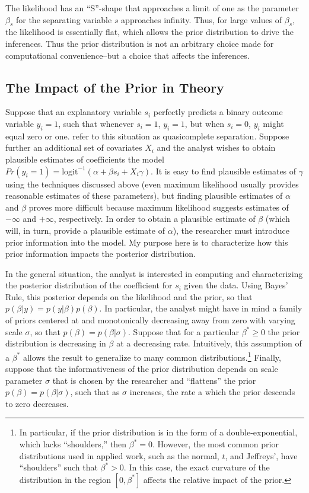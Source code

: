 \documentclass[12pt]{article}
\begin{document}
The likelihood has an ``S''-shape that approaches a limit of one as the parameter $\beta_s$ for the separating variable $s$ approaches infinity. Thus, for large values of $\beta_s$, the likelihood is essentially flat, which allows the prior distribution to drive the inferences. Thus the prior distribution is not an arbitrary choice made for computational convenience--but a choice that affects the inferences.

\subsection*{The Impact of the Prior in Theory}

Suppose that an explanatory variable $s_i$ perfectly predicts a binary outcome variable $y_i = 1$, such that whenever $s_i = 1$, $y_i = 1$, but when $s_i = 0$, $y_i$ might equal zero or one. \cite{AlbertAnderson1984} refer to this situation as quasicomplete separation. Suppose further an additional set of covariates $X_i$ and the analyst wishes to obtain plausible estimates of coefficients the model $Pr(y_i =1) = \text{logit}^{-1}(\alpha + \beta s_i + X_i \gamma)$. It is easy to find plausible estimates of $\gamma$ using the techniques discussed above (even maximum likelihood usually provides reasonable estimates of these parameters), but finding plausible estimates of $\alpha$ and $\beta$ proves more difficult because maximum likelihood suggests estimates of $-\infty$ and $+\infty$, respectively. In order to obtain a plausible estimate of $\beta$ (which will, in turn, provide a plausible estimate of $\alpha$), the researcher must introduce prior information into the model. My purpose here is to characterize how this prior information impacts the posterior distribution.

In the general situation, the analyst is interested in computing and characterizing the posterior distribution of the coefficient for $s_i$ given the data. Using Bayes' Rule, this posterior depends on the likelihood and the prior, so that $p(\beta | y) = p(y|\beta)p(\beta)$. In particular, the analyst might have in mind a family of priors centered at and monotonically decreasing away from zero with varying scale $\sigma$, so that $p(\beta) = p(\beta|\sigma)$. Suppose that for a particular $\beta^* \geq 0$ the prior distribution is decreasing in $\beta$ at a decreasing rate. Intuitively, this assumption of a $\beta^*$ allows the result to generalize to many common distributions.\footnote{In particular, if the prior distribution is in the form of a double-exponential, which lacks ``shoulders,'' then $\beta^* = 0$. However, the most common prior distributions used in applied work, such as the normal, $t$, and Jeffreys', have ``shoulders'' such that $\beta^* > 0$. In this case, the exact curvature of the distribution in the region $[0, \beta^*]$ affects the relative impact of the prior.} 
Finally, suppose that the informativeness of the prior distribution depends on scale parameter $\sigma$ that is chosen by the researcher and ``flattens'' the prior $p(\beta) = p(\beta | \sigma)$, such that as $\sigma$ increases, the rate a which the prior descends to zero decreases.
\end{document}

